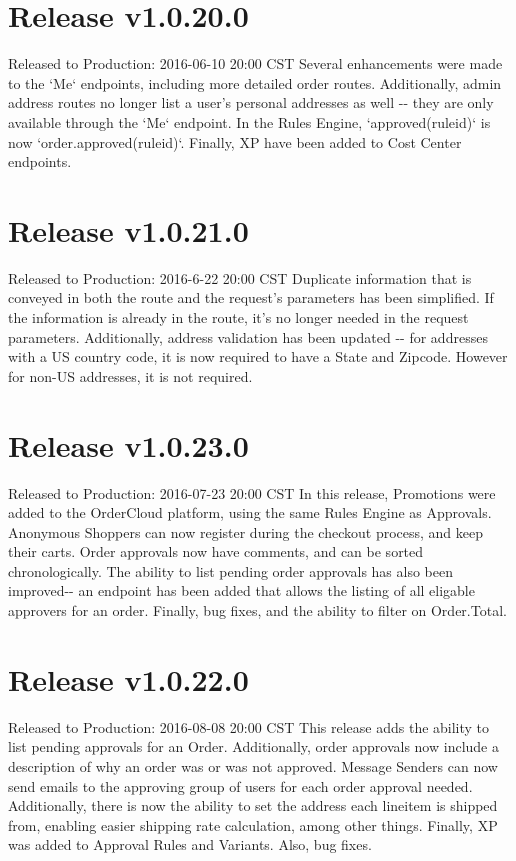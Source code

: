 \documentclass{article}%
\begin{document}
%
\section{Release v1.0.20.0}%
\label{sec:Release v1.0.20.0}%
Released to Production: 2016{-}06{-}10 20:00 CST%
\newline%
Several enhancements were made to the `Me` endpoints, including more detailed order routes. Additionally, admin address routes no longer list a user's personal addresses as well {-}{-} they are only available through the `Me` endpoint. In the Rules Engine, `approved(ruleid)` is now `order.approved(ruleid)`. Finally, XP have been added to Cost Center endpoints.

%
\section{Release v1.0.21.0}%
\label{sec:Release v1.0.21.0}%
Released to Production: 2016{-}6{-}22 20:00 CST%
\newline%
Duplicate information that is conveyed in both the route and the request's parameters has been simplified. If the information is already in the route, it's no longer needed in the request parameters. Additionally, address validation has been updated {-}{-} for addresses with a US country code, it is now required to have a State and Zipcode. However for non{-}US addresses, it is not required.

%
\section{Release v1.0.23.0}%
\label{sec:Release v1.0.23.0}%
Released to Production: 2016{-}07{-}23 20:00 CST%
\newline%
In this release, Promotions were added to the OrderCloud platform, using the same Rules Engine as Approvals. Anonymous Shoppers can now register during the checkout process, and keep their carts. Order approvals now have comments, and can be sorted chronologically. The ability to list pending order approvals has also been improved{-}{-} an endpoint has been added that allows the listing of all eligable approvers for an order. Finally, bug fixes, and the ability to filter on Order.Total.

%
\section{Release v1.0.22.0}%
\label{sec:Release v1.0.22.0}%
Released to Production: 2016{-}08{-}08 20:00 CST%
\newline%
This release adds the ability to list pending approvals for an Order. Additionally, order approvals now include a description of why an order was or was not approved. Message Senders can now send emails to the approving group of users for each order approval needed. Additionally, there is now the ability to set the address each lineitem is shipped from, enabling easier shipping rate calculation, among other things. Finally, XP was added to Approval Rules and Variants. Also, bug fixes.
\end{document}
